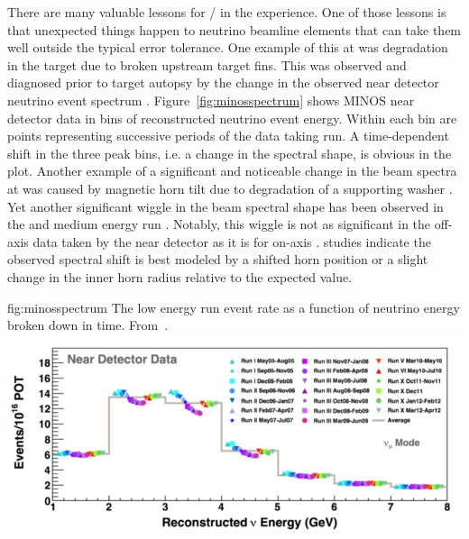 There are many valuable lessons for / in the  experience. One of those lessons is that unexpected things happen to neutrino beamline elements that can take them well outside the typical error tolerance.  One example of this at  was degradation in the target due to broken upstream target fins.  This was observed and diagnosed prior to target autopsy by the change in the observed near detector neutrino event spectrum \cite{Holin2017}.  Figure~\ref{fig:minosspectrum} shows MINOS near detector data in bins of reconstructed neutrino event energy.  Within each bin are points representing successive periods of the data taking run.  A time-dependent shift in the three peak bins, i.e. a change in the spectral shape, is obvious in the plot. Another example of a significant and noticeable change in the beam spectra at  was caused by magnetic horn tilt due to degradation of a supporting washer \cite{Hylen2016}.  Yet another significant wiggle in the beam spectral shape has been observed in the  and  medium energy run \cite{JenaNUINT2018}.  Notably, this wiggle is not as significant in the off-axis data taken by the  near detector as it is for on-axis .   studies indicate the observed spectral shift is best modeled by a shifted horn position or a slight change in the inner horn radius relative to the expected value.

\begin{dunefigure}{fig:minosspectrum}
{The low energy run  event rate as a function of neutrino energy broken down in time. From~\cite{Holin2017}.}
  \includegraphics[width=5.in]{graphics/MINOS_LE_run.jpg}
\end{dunefigure}

